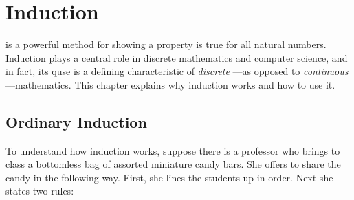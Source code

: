 \chapter{Induction}\label{induction_chap}

 is a powerful method for showing a property is true
for all natural numbers.  Induction plays a central role in discrete
mathematics and computer science, and in fact, its quse is a defining
characteristic of \emph{discrete} ---as opposed to \emph{continuous}
---mathematics.  This chapter explains why induction works and how to
use it.

\iffalse
we'll introduce induction and a variant called \term{strong
induction}.  Although these two version of methods look and feel
different, it turns out that they are equivalent in the sense that a
proof using any one of the methods can be automatically reformatted so
that it becomes a proof using any of the other methods.  The choice of
which method to use is up to you and typically depends on whichever
seems to be the easiest or most natural for the problem at hand.
\fi


\section{Ordinary Induction}\label{ordinary_induct_chap}

To understand how induction works, suppose there is a professor who
brings to class a bottomless bag of assorted miniature candy bars.
She offers to share the candy in the following way.  First, she lines
the students up in order.  Next she states two rules:


